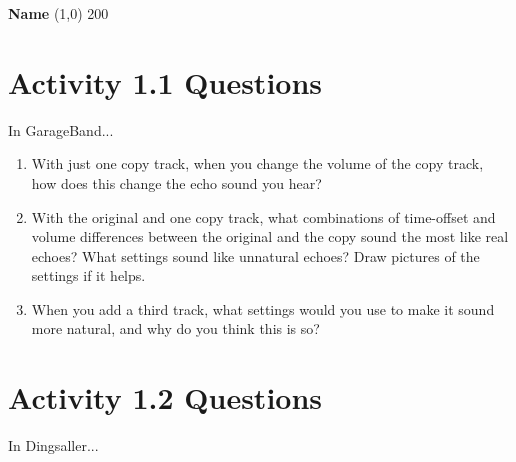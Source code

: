 \documentclass[11pt]{article}
\begin{document}
{\bf \Large Name } \line(1,0) {200}

\section*{\bf Activity 1.1 Questions}

In GarageBand...

\begin{enumerate}

\item With just one copy track, when you change the volume of the copy track, how does this change the echo sound you hear? \\

\vspace{50mm}

\item With the original and one copy track, what combinations of time-offset and volume differences between the original and the copy sound the most like real echoes?  What settings sound like unnatural echoes?  Draw pictures of the settings if it helps.

\vspace{50mm}

\item When you add a third track, what settings would you use to make it sound more natural, and why do you think this is so?

\end{enumerate}

\newpage

\section*{Activity 1.2 Questions}

In Dingsaller...
\end{document}
